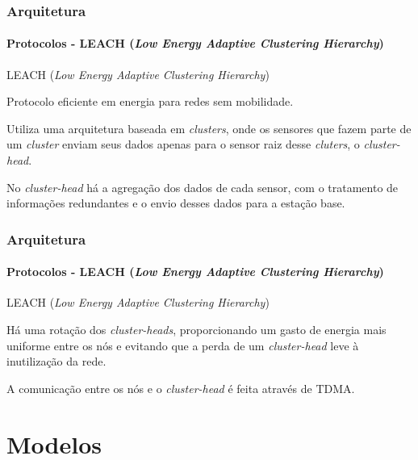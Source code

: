 \documentclass[notes]{beamer}
\begin{document}
\begin{frame}
\label{slide_56}
\frametitle{Arquitetura}
\framesubtitle{Protocolos - LEACH (\textit{Low Energy Adaptive Clustering Hierarchy})}

\begin{block}{LEACH (\textit{Low Energy Adaptive Clustering Hierarchy})}

Protocolo eficiente em energia para redes sem mobilidade.

\end{block} \pause

\begin{block}

Utiliza uma arquitetura baseada em \textit{clusters}, onde os sensores que fazem parte de um \textit{cluster} enviam seus dados apenas para o sensor raiz desse \textit{cluters}, o \textit{cluster-head}. 

\end{block} \pause

\begin{block}

No \textit{cluster-head} há a agregação dos dados de cada sensor, com o tratamento de informações redundantes e o envio desses dados para a estação base.

\end{block} 

\end{frame}

\begin{frame}
\label{slide_57}
\frametitle{Arquitetura}
\framesubtitle{Protocolos - LEACH (\textit{Low Energy Adaptive Clustering Hierarchy})}

\begin{block}{LEACH (\textit{Low Energy Adaptive Clustering Hierarchy})}

Há uma rotação dos \textit{cluster-heads}, proporcionando um gasto de energia mais uniforme entre os nós e evitando que a perda de um \textit{cluster-head} leve à inutilização da rede.

\end{block} \pause

\begin{block}

A comunicação entre os nós e o \textit{cluster-head} é feita através de TDMA.

\end{block}

\end{frame}

\section{Modelos}
\end{document}
